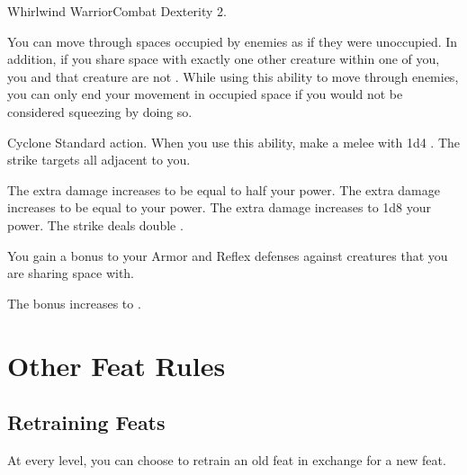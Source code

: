   \begin{feat}{Whirlwind Warrior}{Combat}
    \featpre Dexterity 2.

     You can move through spaces occupied by enemies as if they were unoccupied.
    In addition, if you share space with exactly one other creature within one  of you, you and that creature are not \squeezing.
    While using this ability to move through enemies, you can only end your movement in occupied space if you would not be considered squeezing by doing so.

    \begin{activeability}{Cyclone}
      \abilityusagetime Standard action.
      \rankline
      When you use this ability, make a melee  with 1d4 .
      The strike targets all  adjacent to you.

      \rankline
       The extra damage increases to be equal to half your power.
       The extra damage increases to be equal to your power.
       The extra damage increases to 1d8 \add your power.
       The strike deals double .
    \end{activeability}

     You gain a  bonus to your Armor and Reflex defenses against creatures that you are sharing space with.

     The bonus increases to .
  \end{feat}

\section{Other Feat Rules}

  \subsection{Retraining Feats}
    At every level, you can choose to retrain an old feat in exchange for a new feat.

